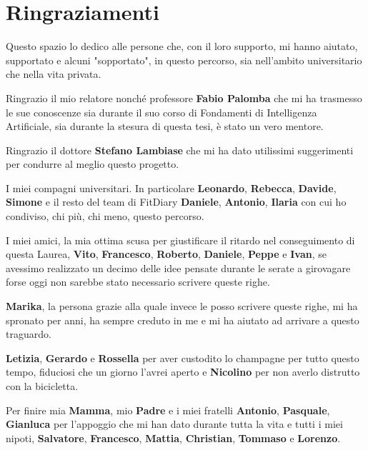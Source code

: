 \chapter{Ringraziamenti}
Questo spazio lo dedico alle persone che, con il loro supporto, mi hanno aiutato, supportato e alcuni "sopportato", in questo percorso, sia nell'ambito universitario che nella vita privata.

Ringrazio il mio relatore nonché professore \textbf{Fabio Palomba} che mi ha trasmesso le sue conoscenze sia durante il suo corso di Fondamenti di Intelligenza Artificiale, sia durante la stesura di questa tesi, è stato un vero mentore.

Ringrazio il dottore \textbf{Stefano Lambiase} che mi ha dato utilissimi suggerimenti per condurre al meglio questo progetto.

I miei compagni universitari. In particolare \textbf{Leonardo}, \textbf{Rebecca}, \textbf{Davide}, \textbf{Simone} e il resto del team di FitDiary \textbf{Daniele}, \textbf{Antonio}, \textbf{Ilaria} con cui ho condiviso, chi più, chi meno, questo percorso.
\vspace{0.5cm}

I miei amici, la mia ottima scusa per giustificare il ritardo nel conseguimento di questa Laurea, \textbf{Vito}, \textbf{Francesco}, \textbf{Roberto}, \textbf{Daniele}, \textbf{Peppe} e \textbf{Ivan}, se avessimo realizzato un decimo delle idee pensate durante le serate a girovagare forse oggi non sarebbe stato necessario scrivere queste righe.

\textbf{Marika}, la persona grazie alla quale invece le posso scrivere queste righe, mi ha spronato per anni, ha sempre creduto in me e mi ha aiutato ad arrivare a questo traguardo.
\vspace{0.5cm}

\textbf{Letizia}, \textbf{Gerardo} e \textbf{Rossella} per aver custodito lo champagne per tutto questo tempo, fiduciosi che un giorno l'avrei aperto e \textbf{Nicolino} per non averlo distrutto con la bicicletta.
\vspace{0.5cm}

Per finire mia \textbf{Mamma}, mio \textbf{Padre} e i miei fratelli \textbf{Antonio}, \textbf{Pasquale}, \textbf{Gianluca} per l'appoggio che mi han dato durante tutta la vita e tutti i miei nipoti, \textbf{Salvatore}, \textbf{Francesco}, \textbf{Mattia}, \textbf{Christian}, \textbf{Tommaso} e \textbf{Lorenzo}.